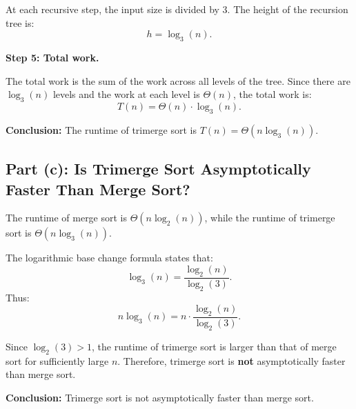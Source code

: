 \documentclass{article}
\begin{document}
At each recursive step, the input size is divided by 3. The height of the recursion tree is:
\[
h = \log_3(n).
\]

\textbf{Step 5: Total work.}

The total work is the sum of the work across all levels of the tree. Since there are \( \log_3(n) \) levels and the work at each level is \( \Theta(n) \), the total work is:
\[
T(n) = \Theta(n) \cdot \log_3(n).
\]

\textbf{Conclusion:} The runtime of trimerge sort is \( T(n) = \Theta(n \log_3(n)) \).

\subsection*{Part (c): Is Trimerge Sort Asymptotically Faster Than Merge Sort?}

The runtime of merge sort is \( \Theta(n \log_2(n)) \), while the runtime of trimerge sort is \( \Theta(n \log_3(n)) \).

The logarithmic base change formula states that:
\[
\log_3(n) = \frac{\log_2(n)}{\log_2(3)}.
\]
Thus:
\[
n \log_3(n) = n \cdot \frac{\log_2(n)}{\log_2(3)}.
\]

Since \( \log_2(3) > 1 \), the runtime of trimerge sort is larger than that of merge sort for sufficiently large \( n \). Therefore, trimerge sort is \textbf{not} asymptotically faster than merge sort.

\textbf{Conclusion:} Trimerge sort is not asymptotically faster than merge sort.
\end{document}
